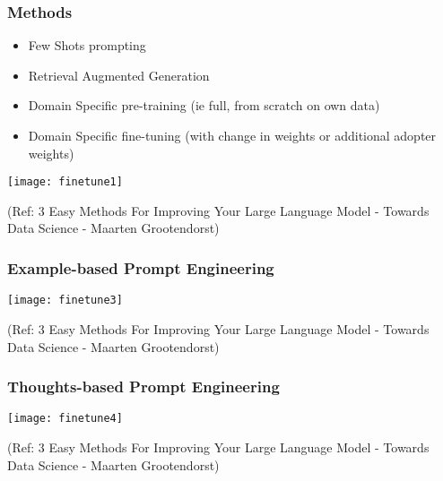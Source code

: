 \begin{frame}[fragile]\frametitle{Methods}
  \begin{itemize}
	\item Few Shots prompting
	\item Retrieval Augmented Generation
	\item Domain Specific pre-training (ie full, from scratch on own data)
	\item Domain Specific fine-tuning (with change in weights or additional adopter weights)
  \end{itemize}

		\begin{center}
		\texttt{[image: finetune1]}
		\end{center}

{\tiny (Ref: 3 Easy Methods For Improving Your Large Language Model - Towards Data Science - Maarten Grootendorst)}

\end{frame}

\begin{frame}[fragile]\frametitle{Example-based Prompt Engineering}


		\begin{center}
		\texttt{[image: finetune3]}
		\end{center}

{\tiny (Ref: 3 Easy Methods For Improving Your Large Language Model - Towards Data Science - Maarten Grootendorst)}

\end{frame}

\begin{frame}[fragile]\frametitle{Thoughts-based Prompt Engineering}


		\begin{center}
		\texttt{[image: finetune4]}
		\end{center}

{\tiny (Ref: 3 Easy Methods For Improving Your Large Language Model - Towards Data Science - Maarten Grootendorst)}

\end{frame}

